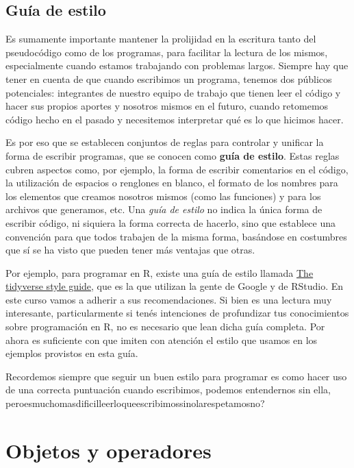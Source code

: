 \documentclass[
]{book}
\begin{document}
\hypertarget{guuxeda-de-estilo}{%
\section{Guía de estilo}\label{guuxeda-de-estilo}}

Es sumamente importante mantener la prolijidad en la escritura tanto del pseudocódigo como de los programas, para facilitar la lectura de los mismos, especialmente cuando estamos trabajando con problemas largos. Siempre hay que tener en cuenta de que cuando escribimos un programa, tenemos dos públicos potenciales: integrantes de nuestro equipo de trabajo que tienen leer el código y hacer sus propios aportes y nosotros mismos en el futuro, cuando retomemos código hecho en el pasado y necesitemos interpretar qué es lo que hicimos hacer.

Es por eso que se establecen conjuntos de reglas para controlar y unificar la forma de escribir programas, que se conocen como \textbf{guía de estilo}. Estas reglas cubren aspectos como, por ejemplo, la forma de escribir comentarios en el código, la utilización de espacios o renglones en blanco, el formato de los nombres para los elementos que creamos nosotros mismos (como las funciones) y para los archivos que generamos, etc. Una \emph{guía de estilo} no indica la única forma de escribir código, ni siquiera la forma correcta de hacerlo, sino que establece una convención para que todos trabajen de la misma forma, basándose en costumbres que sí se ha visto que pueden tener más ventajas que otras.

Por ejemplo, para programar en R, existe una guía de estilo llamada \href{https://style.tidyverse.org/}{The tidyverse style guide}, que es la que utilizan la gente de Google y de RStudio. En este curso vamos a adherir a sus recomendaciones. Si bien es una lectura muy interesante, particularmente si tenés intenciones de profundizar tus conocimientos sobre programación en R, no es necesario que lean dicha guía completa. Por ahora es suficiente con que imiten con atención el estilo que usamos en los ejemplos provistos en esta guía.

Recordemos siempre que seguir un buen estilo para programar es como hacer uso de una correcta puntuación cuando escribimos, podemos entendernos sin ella, peroesmuchomasdificilleerloqueescribimossinolarespetamosno?

\hypertarget{objetos-y-operadores}{%
\chapter{Objetos y operadores}\label{objetos-y-operadores}}
\end{document}
